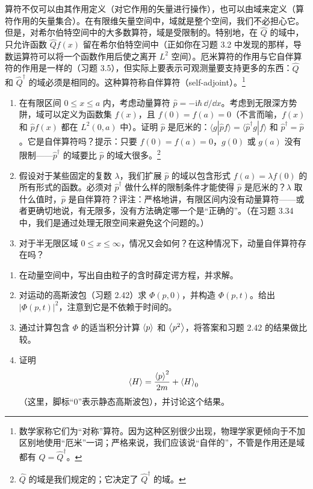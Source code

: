 算符不仅可以由其作用定义（对它作用的矢量进行操作），也可以由域来定义（算符作用的矢量集合）。在有限维矢量空间中，域就是整个空间，我们不必担心它。但是，对希尔伯特空间中的大多数算符，域是受限制的。特别地，在 $\hat Q$ 的域中，只允许函数 $\hat Qf(x)$ 留在希尔伯特空间中（正如你在习题 3.2 中发现的那样，导数运算符可以将一个函数作用后使之离开 $L^2$ 空间）。厄米算符的作用与它自伴算符的作用是一样的（习题 3.5），但实际上要表示可观测量要支持更多的东西：$\hat Q$ 和 $\hat Q^\dagger$ 的域必须是相同的。这种算符称自伴算符（self-adjoint）。\footnote{数学家称它们为“对称”算符。因为这种区别很少出现，物理学家更倾向于不加区别地使用“厄米”一词；严格来说，我们应该说“自伴的”，不管是作用还是域都有 $\hat Q=\hat Q^\dagger$。}
\begin{enumerate}
\item 在有限区间 $0\leq x\leq a$ 内，考虑动量算符 $\hat p=-\mathrm{i}\hbar\,\dd/\dd x$。考虑到无限深方势阱，域可以定义为函数集 $f(x)$，且 $f(0)=f(a)=0$（不言而喻，$f(x)$ 和 $\hat pf(x)$ 都在 $L^2(0,a)$ 中）。证明 $\hat p$ 是厄米的：$\langle g|\hat pf\rangle=\langle\hat p^\dagger g|f\rangle$ 和 $\hat p^\dagger=\hat p$。它是自伴算符吗？提示：只要 $f(0)=f(a)=0$，$g(0)$ 或 $g(a)$ 没有限制——$\hat p^\dagger$ 的域要比 $\hat p$ 的域大很多。\footnote{$\hat Q$ 的域是我们规定的；它决定了 $\hat Q^\dagger$ 的域。}
\item 假设对于某些固定的复数 $\lambda$，我们扩展 $\hat p$ 的域以包含形式 $f(a)=\lambda f(0)$ 的所有形式的函数。必须对 $\hat p^\dagger$ 做什么样的限制条件才能使得 $\hat p$ 是厄米的？$\lambda$ 取什么值时，$\hat p$ 是自伴算符？评注：严格地讲，有限区间内没有动量算符——或者更确切地说，有无限多，没有方法确定哪一个是“正确的”。（在习题 3.34 中，我们是通过处理无限空间来避免这个问题的。）
\item 对于半无限区域 $0\leq x\leq\infty$，情况又会如何？在这种情况下，动量自伴算符存在吗？
\end{enumerate}
\vfill

\begin{enumerate}
\item 在动量空间中，写出自由粒子的含时薛定谔方程，并求解。
\item 对运动的高斯波包（习题 2.42）求 $\Phi(p,0)$，并构造 $\Phi(p,t)$。给出 $|\Phi(p,t)|^2$，注意到它是不依赖于时间的。
\item 通过计算包含 $\Phi$ 的适当积分计算 $\left\langle p\right\rangle$ 和 $\left\langle p^2\right\rangle$，将答案和习题 2.42 的结果做比较。
\item 证明
\[
\left\langle H\right\rangle=\frac{\left\langle p\right\rangle^2}{2m}+\left\langle H\right\rangle_0
\]
（这里，脚标“$0$”表示静态高斯波包），并讨论这个结果。
\end{enumerate}
\vfill
